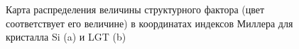   \begin{figure}[H]
    \centering
    \hfill
    \caption{Карта распределения величины структурного фактора
    (цвет соответствует его величине) в координатах индексов Миллера для кристалла Si (a) и LGT (b)}
    \label{ris:hkl_LGT_SI}
  \end{figure}
